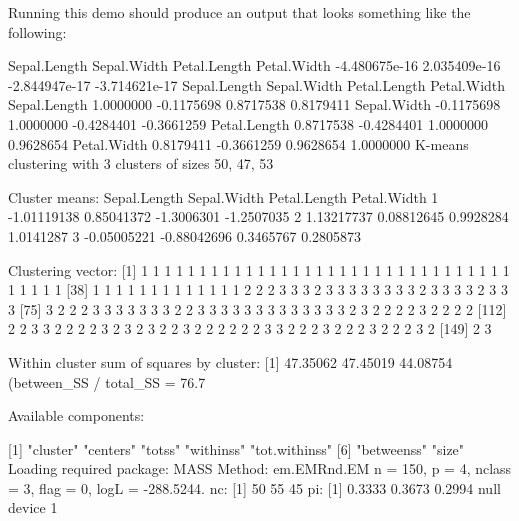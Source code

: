 Running this demo should produce an output that looks something like the
following:
\begin{Output}
 Sepal.Length   Sepal.Width  Petal.Length   Petal.Width 
-4.480675e-16  2.035409e-16 -2.844947e-17 -3.714621e-17 
             Sepal.Length Sepal.Width Petal.Length Petal.Width
Sepal.Length    1.0000000  -0.1175698    0.8717538   0.8179411
Sepal.Width    -0.1175698   1.0000000   -0.4284401  -0.3661259
Petal.Length    0.8717538  -0.4284401    1.0000000   0.9628654
Petal.Width     0.8179411  -0.3661259    0.9628654   1.0000000
K-means clustering with 3 clusters of sizes 50, 47, 53

Cluster means:
  Sepal.Length Sepal.Width Petal.Length Petal.Width
1  -1.01119138  0.85041372   -1.3006301  -1.2507035
2   1.13217737  0.08812645    0.9928284   1.0141287
3  -0.05005221 -0.88042696    0.3465767   0.2805873

Clustering vector:
  [1] 1 1 1 1 1 1 1 1 1 1 1 1 1 1 1 1 1 1 1 1 1 1 1 1 1 1 1 1 1 1 1 1 1 1 1 1 1
 [38] 1 1 1 1 1 1 1 1 1 1 1 1 1 2 2 2 3 3 3 2 3 3 3 3 3 3 3 3 2 3 3 3 3 2 3 3 3
 [75] 3 2 2 2 3 3 3 3 3 3 3 2 2 3 3 3 3 3 3 3 3 3 3 3 3 3 2 3 2 2 2 2 3 2 2 2 2
[112] 2 2 3 3 2 2 2 2 3 2 3 2 3 2 2 3 2 2 2 2 2 2 3 3 2 2 2 3 2 2 2 3 2 2 2 3 2
[149] 2 3

Within cluster sum of squares by cluster:
[1] 47.35062 47.45019 44.08754
 (between_SS / total_SS =  76.7 %

Available components:

[1] "cluster"      "centers"      "totss"        "withinss"     "tot.withinss"
[6] "betweenss"    "size"        
Loading required package: MASS
Method: em.EMRnd.EM
 n = 150, p = 4, nclass = 3, flag = 0, logL = -288.5244.
nc: 
[1] 50 55 45
pi: 
[1] 0.3333 0.3673 0.2994
null device 
          1 
\end{Output}

